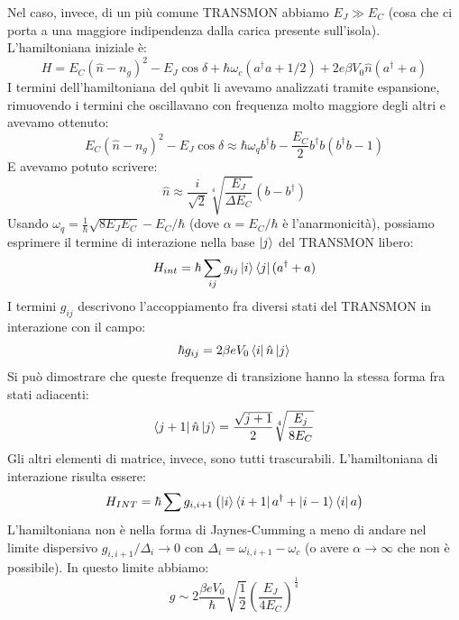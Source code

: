Nel caso, invece, di un più comune TRANSMON abbiamo $E_J \gg E_C$ (cosa che ci porta a una maggiore indipendenza dalla carica presente sull'isola). L'hamiltoniana iniziale è:
\begin{equation*}
    H=E_C (\hat n - n_g)^2 - E_J \cos \delta + \hbar \omega_c (a^\dagger a + 1/2) + 2e\beta V_0 \hat n (a^\dagger + a)
\end{equation*}
I termini dell'hamiltoniana del qubit li avevamo analizzati tramite espansione, rimuovendo i termini che oscillavano con frequenza molto maggiore degli altri e avevamo ottenuto:
\begin{equation*}
    E_C(\hat n - n_g)^2 - E_J \cos \delta \approx \hbar \omega_q b^\dagger b - \frac{E_C}{2}b^\dagger b(b^\dagger b - 1)
\end{equation*}
E avevamo potuto scrivere:
\begin{equation*}
    \hat n \approx \frac{i}{\sqrt 2}\sqrt[4]{\frac{E_J}{\Delta E_C}}(b-b^\dagger)
\end{equation*}
Usando $\omega_q = \frac{1}{\hbar}\sqrt{8E_J E_C}- E_C/\hbar$ (dove $\alpha=E_C/\hbar$ è l'anarmonicità), possiamo esprimere il termine di interazione nella base $\ket j$ del TRANSMON libero:
\begin{equation*}
    H_{int}= \hbar \sum_{ij} g_{ij} \ket{ i} \bra j (a^\dagger + a)
\end{equation*}
I termini $g_{ij}$ descrivono l'accoppiamento fra diversi stati del TRANSMON in interazione con il campo:
\begin{equation*}
    \hbar g_{ij} = 2 \beta e V_0 \bra i \hat n \ket j
\end{equation*}
Si può dimostrare che queste frequenze di transizione hanno la stessa forma fra stati adiacenti:
\begin{equation*}
    \bra{j+1}\hat n \ket j = \frac{\sqrt{j+1}}{2}\sqrt[4]{\frac{E_j}{8E_C}}
\end{equation*}
Gli altri elementi di matrice, invece, sono tutti trascurabili.
L'hamiltoniana di interazione risulta essere:
\begin{equation*}
    H_{INT} = \hbar \sum g_{i,i+1}\left( \ket i \bra{i+1}a^\dagger + \ket{i-1}\bra i a \right)
\end{equation*}
L'hamiltoniana non è nella forma di Jaynes-Cumming a meno di andare nel limite dispersivo $g_{i,i+1}/\Delta_i \rightarrow 0$ con $\Delta_i = \omega_{i,i+1} -\omega_c$ (o avere $\alpha \rightarrow\infty$ che non è possibile). In questo limite abbiamo:
\begin{equation*}
    g \sim 2 \frac{\beta e V_0}{\hbar} \sqrt{\frac{1}{2}} \left( \frac{E_J}{4E_C}\right)^{\frac{1}{4}}
\end{equation*}
